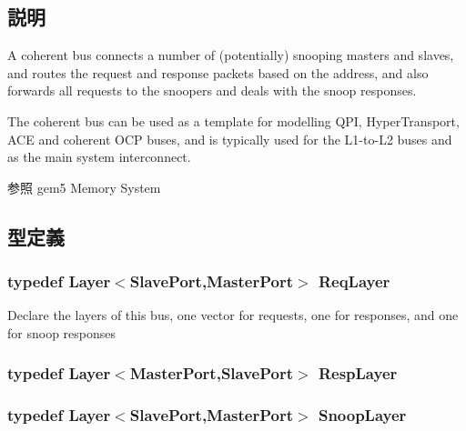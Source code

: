 \subsection{説明}
A coherent bus connects a number of (potentially) snooping masters and slaves, and routes the request and response packets based on the address, and also forwards all requests to the snoopers and deals with the snoop responses.

The coherent bus can be used as a template for modelling QPI, HyperTransport, ACE and coherent OCP buses, and is typically used for the L1-\/to-\/L2 buses and as the main system interconnect. \begin{DoxySeeAlso}{参照}
gem5 Memory System 
\end{DoxySeeAlso}


\subsection{型定義}
\hypertarget{classCoherentBus_ae15f02c0dca186fbfbd2f7b732e5b441}{
\subsubsection[{ReqLayer}]{\setlength{\rightskip}{0pt plus 5cm}typedef {\bf Layer}$<${\bf SlavePort},{\bf MasterPort}$>$ {\bf ReqLayer}}}
\label{classCoherentBus_ae15f02c0dca186fbfbd2f7b732e5b441}
Declare the layers of this bus, one vector for requests, one for responses, and one for snoop responses \hypertarget{classCoherentBus_a40797c56ea5eaf481f56dfdc3ab1b399}{
\subsubsection[{RespLayer}]{\setlength{\rightskip}{0pt plus 5cm}typedef {\bf Layer}$<${\bf MasterPort},{\bf SlavePort}$>$ {\bf RespLayer}}}
\label{classCoherentBus_a40797c56ea5eaf481f56dfdc3ab1b399}
\hypertarget{classCoherentBus_a73f554be8ad7076f9403bb35d6af14f1}{
\subsubsection[{SnoopLayer}]{\setlength{\rightskip}{0pt plus 5cm}typedef {\bf Layer}$<${\bf SlavePort},{\bf MasterPort}$>$ {\bf SnoopLayer}}}
\label{classCoherentBus_a73f554be8ad7076f9403bb35d6af14f1}


